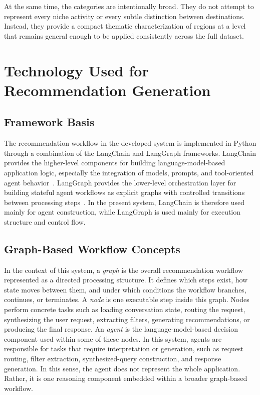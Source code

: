 At the same time, the categories are intentionally broad. They do not attempt to represent every niche activity or every subtle distinction between destinations. Instead, they provide a compact thematic characterization of regions at a level that remains general enough to be applied consistently across the full dataset.

\section{Technology Used for Recommendation Generation}\label{section:recommendation-generation:technology}

\subsection{Framework Basis}

The recommendation workflow in the developed system is implemented in Python through a combination of the LangChain and LangGraph frameworks. LangChain provides the higher-level components for building language-model-based application logic, especially the integration of models, prompts, and tool-oriented agent behavior~\parencite{langchainOverview}. LangGraph provides the lower-level orchestration layer for building stateful agent workflows as explicit graphs with controlled transitions between processing steps~\parencite{langgraphOverview}. In the present system, LangChain is therefore used mainly for agent construction, while LangGraph is used mainly for execution structure and control flow.

\subsection{Graph-Based Workflow Concepts}

In the context of this system, a \emph{graph} is the overall recommendation workflow represented as a directed processing structure. It defines which steps exist, how state moves between them, and under which conditions the workflow branches, continues, or terminates. A \emph{node} is one executable step inside this graph. Nodes perform concrete tasks such as loading conversation state, routing the request, synthesizing the user request, extracting filters, generating recommendations, or producing the final response. An \emph{agent} is the language-model-based decision component used within some of these nodes. In this system, agents are responsible for tasks that require interpretation or generation, such as request routing, filter extraction, synthesized-query construction, and response generation. In this sense, the agent does not represent the whole application. Rather, it is one reasoning component embedded within a broader graph-based workflow.

